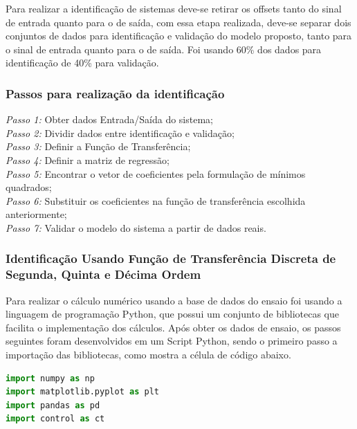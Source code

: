 Para realizar a identificação de sistemas deve-se retirar os offsets tanto do sinal de entrada quanto para o de saída, com essa etapa realizada, deve-se separar dois conjuntos de dados para identificação e validação do modelo proposto, tanto para o sinal de entrada quanto para o de saída. Foi usando 60\% dos dados para identificação de 40\% para validação.

\subsubsection{Passos para realização da identificação}


\noindent\textit{Passo 1:} Obter dados Entrada/Saída do sistema;\\
\textit{Passo 2:} Dividir dados entre identificação e validação;\\
\textit{Passo 3:} Definir a Função de Transferência;\\
\textit{Passo 4:} Definir a matriz de regressão;\\
\textit{Passo 5:} Encontrar o vetor de coeficientes pela formulação de mínimos quadrados;\\
\textit{Passo 6:} Substituir os coeficientes na função de transferência escolhida anteriormente;\\
\textit{Passo 7:} Validar o modelo do sistema a partir de dados reais.\\


\subsubsection{Identificação Usando Função de Transferência Discreta de Segunda, Quinta e Décima Ordem}

Para realizar o cálculo numérico usando a base de dados do ensaio foi usando a linguagem de programação Python, que possui um conjunto de bibliotecas que facilita o implementação dos cálculos. Após obter os dados de ensaio, os passos seguintes foram desenvolvidos em um Script Python, sendo o primeiro passo a importação das bibliotecas, como mostra a célula de código abaixo.

\vspace{0.5cm}

\begin{lstlisting}[language=python]
import numpy as np 
import matplotlib.pyplot as plt
import pandas as pd
import control as ct
\end{lstlisting}

